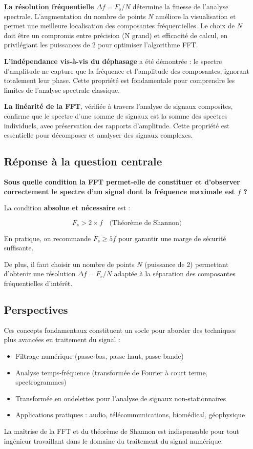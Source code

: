 \documentclass[12pt,a4paper]{article}
\begin{document}
\textbf{La résolution fréquentielle} $\Delta f = F_s/N$ détermine la finesse de l'analyse spectrale. L'augmentation du nombre de points $N$ améliore la visualisation et permet une meilleure localisation des composantes fréquentielles. Le choix de $N$ doit être un compromis entre précision (N grand) et efficacité de calcul, en privilégiant les puissances de 2 pour optimiser l'algorithme FFT.

\textbf{L'indépendance vis-à-vis du déphasage} a été démontrée : le spectre d'amplitude ne capture que la fréquence et l'amplitude des composantes, ignorant totalement leur phase. Cette propriété est fondamentale pour comprendre les limites de l'analyse spectrale classique.

\textbf{La linéarité de la FFT}, vérifiée à travers l'analyse de signaux composites, confirme que le spectre d'une somme de signaux est la somme des spectres individuels, avec préservation des rapports d'amplitude. Cette propriété est essentielle pour décomposer et analyser des signaux complexes.

\subsection{Réponse à la question centrale}

\textbf{Sous quelle condition la FFT permet-elle de constituer et d'observer correctement le spectre d'un signal dont la fréquence maximale est $f$ ?}

La condition \textbf{absolue et nécessaire} est :

\begin{equation}
    \boxed{F_s > 2 \times f \quad \text{(Théorème de Shannon)}}
\end{equation}

En pratique, on recommande $F_s \geq 5f$ pour garantir une marge de sécurité suffisante.

De plus, il faut choisir un nombre de points $N$ (puissance de 2) permettant d'obtenir une résolution $\Delta f = F_s/N$ adaptée à la séparation des composantes fréquentielles d'intérêt.

\subsection{Perspectives}

Ces concepts fondamentaux constituent un socle pour aborder des techniques plus avancées en traitement du signal :
\begin{itemize}
    \item Filtrage numérique (passe-bas, passe-haut, passe-bande)
    \item Analyse temps-fréquence (transformée de Fourier à court terme, spectrogrammes)
    \item Transformée en ondelettes pour l'analyse de signaux non-stationnaires
    \item Applications pratiques : audio, télécommunications, biomédical, géophysique
\end{itemize}

La maîtrise de la FFT et du théorème de Shannon est indispensable pour tout ingénieur travaillant dans le domaine du traitement du signal numérique.
\end{document}
